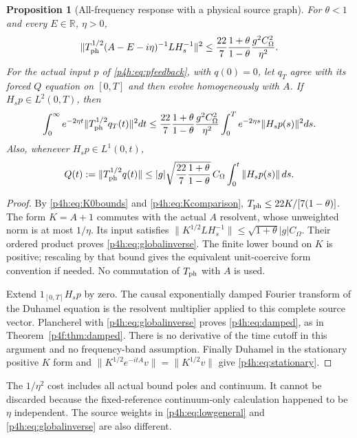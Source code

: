 \documentclass[11pt]{article}
\numberwithin{equation}{section}
\newtheorem{proposition}[theorem]{Proposition}
\theoremstyle{definition}
\theoremstyle{remark}
\begin{document}
\begin{proposition}[All-frequency response with a physical source graph]
\label{p4h:prop:global}
For $\theta<1$ and every $E\in\mathbb R$, $\eta>0$,
\begin{equation}\label{p4h:eq:globalinverse}
 \|T_{\rm ph}^{1/2}(A-E-i\eta)^{-1}LH_s^{-1}\|^2
 \leq \frac{22}{7}\frac{1+\theta}{1-\theta}
                         \frac{g^2C_\Omega^2}{\eta^2}.
\end{equation}
For the actual input $p$ of \eqref{p4h:eq:pfeedback}, with
$q(0)=0$, let $q_T$ agree with its forced $Q$ equation on
$[0,T]$ and then evolve homogeneously with $A$. If
$H_sp\in L^2(0,T)$, then
\begin{equation}\label{p4h:eq:damped}
 \int_0^\infty e^{-2\eta t}\|T_{\rm ph}^{1/2}q_T(t)\|^2dt
 \leq \frac{22}{7}\frac{1+\theta}{1-\theta}
       \frac{g^2C_\Omega^2}{\eta^2}
                \int_0^T e^{-2\eta s}\|H_sp(s)\|^2ds .
\end{equation}
Also, whenever $H_sp\in L^1(0,t)$,
\begin{equation}\label{p4h:eq:stationary}
 Q(t):=\|T_{\rm ph}^{1/2}q(t)\|
 \leq |g|\sqrt{\frac{22}{7}\frac{1+\theta}{1-\theta}}\,
                         C_\Omega\int_0^t\|H_sp(s)\|\,ds .
\end{equation}
\end{proposition}
\begin{proof}
By \eqref{p4h:eq:K0bounds} and \eqref{p4h:eq:Kcomparison},
$T_{\rm ph}\leq22K/[7(1-\theta)]$.
The form $K=A+1$ commutes with the actual $A$ resolvent,
whose unweighted norm is at most $1/\eta$.
Its input satisfies
$\|K^{1/2}LH_s^{-1}\|
\leq\sqrt{1+\theta}|g|C_\Omega$.
Their ordered product proves \eqref{p4h:eq:globalinverse}.
The finite lower bound on $K$ is positive; rescaling by that
bound gives the equivalent unit-coercive form convention
if needed. No commutation of $T_{\rm ph}$ with $A$ is used.

Extend $1_{[0,T]}H_sp$ by zero. The causal exponentially
damped Fourier transform of the Duhamel equation is the
resolvent multiplier applied to this complete source vector.
Plancherel with \eqref{p4h:eq:globalinverse} proves
\eqref{p4h:eq:damped}, as in Theorem~\ref{p4f:thm:damped}.
There is no derivative of the time cutoff in this argument
and no frequency-band assumption.
Finally Duhamel in the stationary positive $K$ form and
$\|K^{1/2}e^{-itA}v\|=\|K^{1/2}v\|$ give
\eqref{p4h:eq:stationary}.
\end{proof}

The $1/\eta^2$ cost includes all actual bound poles and
continuum. It cannot be discarded because the fixed-reference
continuum-only calculation happened to be $\eta$ independent.
The source weights in \eqref{p4h:eq:lowgeneral} and
\eqref{p4h:eq:globalinverse} are also different.
\end{document}
